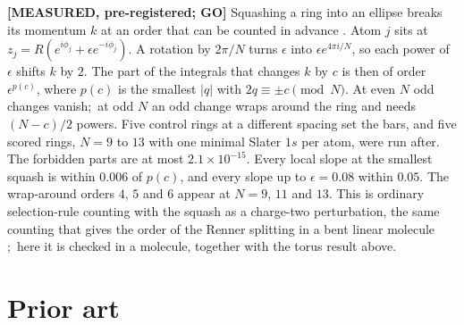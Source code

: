 \documentclass[aps,pra,twocolumn,superscriptaddress,longbibliography]{revtex4-2}
\begin{document}
\textbf{[MEASURED, pre-registered; GO]}  Squashing a ring into an ellipse
breaks its momentum $k$ at an order that can be counted in advance
\cite{sq_record}.  Atom $j$ sits at $z_j = R(e^{i\phi_j} + \epsilon
e^{-i\phi_j})$.  A rotation by $2\pi/N$ turns $\epsilon$ into
$\epsilon e^{4\pi i/N}$, so each power of $\epsilon$ shifts $k$ by $2$.
The part of the integrals that changes $k$ by $c$ is then of order
$\epsilon^{p(c)}$, where $p(c)$ is the smallest $|q|$ with
$2q \equiv \pm c \pmod N$.  At even $N$ odd changes vanish;\ at odd $N$ an
odd change wraps around the ring and needs $(N-c)/2$ powers.  Five control
rings at a different spacing set the bars, and five scored rings,
$N = 9$ to $13$ with one minimal Slater $1s$ per atom, were run after.  The
forbidden parts are at most $2.1\times10^{-15}$.  Every local slope at the
smallest squash is within $0.006$ of $p(c)$, and every slope up to
$\epsilon = 0.08$ within $0.05$.  The wrap-around orders $4$, $5$ and $6$
appear at $N = 9$, $11$ and $13$.  This is ordinary selection-rule counting
with the squash as a charge-two perturbation, the same counting that gives
the order of the Renner splitting in a bent linear molecule
\cite{renner1934};\ here it is checked in a molecule, together with the
torus result above.

\section{Prior art}
\label{sec:prior}
\end{document}
